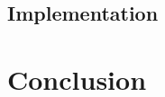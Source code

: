 \documentclass[format=acmsmall, review=false, screen=true]{acmart}
\begin{document}
\subsection{Implementation}




\section{Conclusion}




\end{document}
